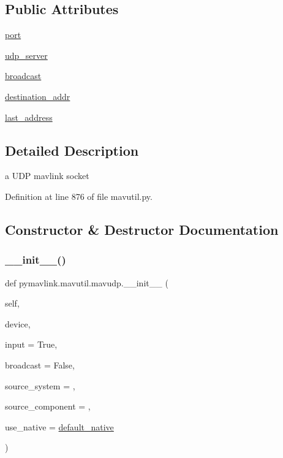 \subsection*{Public Attributes}
\begin{DoxyCompactItemize}
\item 
\mbox{\hyperlink{classpymavlink_1_1mavutil_1_1mavudp_a0ea30c1f7c58ff3c409e50ed8a4b5054}{port}}
\item 
\mbox{\hyperlink{classpymavlink_1_1mavutil_1_1mavudp_a954bbb6e696f876daa2b2b5ef14618ce}{udp\+\_\+server}}
\item 
\mbox{\hyperlink{classpymavlink_1_1mavutil_1_1mavudp_ac5bbd2a998cfe14d2f25dc88a56817bb}{broadcast}}
\item 
\mbox{\hyperlink{classpymavlink_1_1mavutil_1_1mavudp_ab4f8ef948b82aef5124e53c79f4a229a}{destination\+\_\+addr}}
\item 
\mbox{\hyperlink{classpymavlink_1_1mavutil_1_1mavudp_a06c9bffa98ac194a99bd7c4d2cb8b36f}{last\+\_\+address}}
\end{DoxyCompactItemize}


\subsection{Detailed Description}
\begin{DoxyVerb}a UDP mavlink socket\end{DoxyVerb}
 

Definition at line 876 of file mavutil.\+py.



\subsection{Constructor \& Destructor Documentation}
\mbox{\label{classpymavlink_1_1mavutil_1_1mavudp_a6adc1a8a99b6ded71d38be346b2f41c7}} 
\subsubsection{\texorpdfstring{\_\_init\_\_()}{\_\_init\_\_()}}
{\footnotesize\ttfamily def pymavlink.\+mavutil.\+mavudp.\+\_\+\+\_\+init\+\_\+\+\_\+ (\begin{DoxyParamCaption}\item[{}]{self,  }\item[{}]{device,  }\item[{}]{input = {\ttfamily True},  }\item[{}]{broadcast = {\ttfamily False},  }\item[{}]{source\+\_\+system = {},  }\item[{}]{source\+\_\+component = {},  }\item[{}]{use\+\_\+native = {\ttfamily \mbox{\hyperlink{namespacepymavlink_1_1mavutil_a21ce9da7b698a7bc21c44b9f77341b62}{default\+\_\+native}}} }\end{DoxyParamCaption})}



